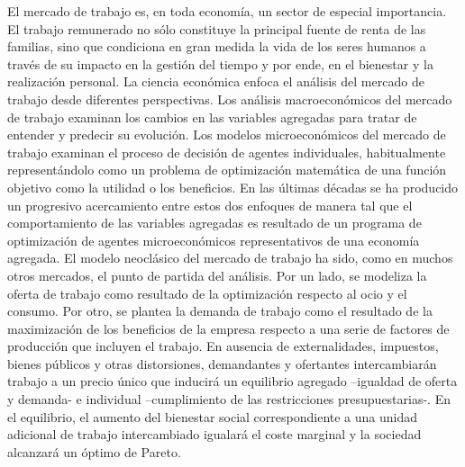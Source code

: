 \documentclass{nuevotema}
\begin{document}
\ideaclave

El mercado de trabajo es, en toda economía, un sector de especial importancia. El trabajo remunerado no sólo constituye la principal fuente de renta de las familias, sino que condiciona en gran medida la vida de los seres humanos a través de su impacto en la gestión del tiempo y por ende, en el bienestar y la realización personal. La ciencia económica enfoca el análisis del mercado de trabajo desde diferentes perspectivas. Los análisis macroeconómicos del mercado de trabajo examinan los cambios en las variables agregadas para tratar de entender y predecir su evolución. Los modelos microeconómicos del mercado de trabajo examinan el proceso de decisión de agentes individuales, habitualmente representándolo como un problema de optimización matemática de una función objetivo como la utilidad o los beneficios. En las últimas décadas se ha producido un progresivo acercamiento entre estos dos enfoques de manera tal que el comportamiento de las variables agregadas es resultado de un programa de optimización de agentes microeconómicos representativos de una economía agregada. El modelo neoclásico del mercado de trabajo ha sido, como en muchos otros mercados, el punto de partida del análisis. Por un lado, se modeliza la oferta de trabajo como resultado de la optimización respecto al ocio y el consumo. Por otro, se plantea la demanda de trabajo como el resultado de la maximización de los beneficios de la empresa respecto a una serie de factores de producción que incluyen el trabajo. En ausencia de externalidades, impuestos, bienes públicos y otras distorsiones, demandantes y ofertantes intercambiarán trabajo a un precio único que inducirá un equilibrio agregado --igualdad de oferta y demanda- e individual --cumplimiento de las restricciones presupuestarias-. En el equilibrio, el aumento del bienestar social correspondiente a una unidad adicional de trabajo intercambiado igualará el coste marginal y la sociedad alcanzará un óptimo de Pareto.
\end{document}
